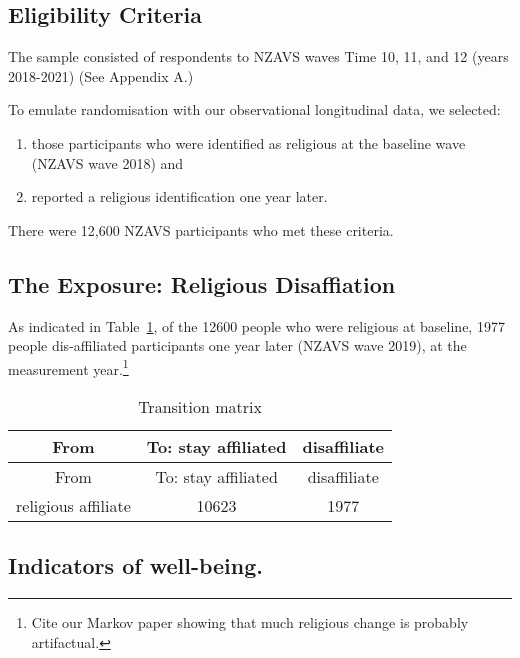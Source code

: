 \documentclass[
  singlecolumn]{report}
\providecommand{\tightlist}{%
  \setlength{\itemsep}{0pt}\setlength{\parskip}{0pt}}\usepackage{longtable,booktabs,array}
\begin{document}
\hypertarget{eligibility-criteria}{%
\subsection{Eligibility Criteria}\label{eligibility-criteria}}

The sample consisted of respondents to NZAVS waves Time 10, 11, and 12
(years 2018-2021) (See Appendix A.)

To emulate randomisation with our observational longitudinal data, we
selected:

\begin{enumerate}
\def\labelenumi{\arabic{enumi}.}
\tightlist
\item
  those participants who were identified as religious at the baseline
  wave (NZAVS wave 2018) and
\item
  reported a religious identification one year later.
\end{enumerate}

There were 12,600 NZAVS participants who met these criteria.

\hypertarget{the-exposure-religious-disaffiation}{%
\subsection{The Exposure: Religious
Disaffiation}\label{the-exposure-religious-disaffiation}}

As indicated in Table~\ref{tbl-transition}, of the 12600 people who were
religious at baseline, 1977 people dis-affiliated participants one year
later (NZAVS wave 2019), at the measurement year.\footnote{Cite our
  Markov paper showing that much religious change is probably
  artifactual.}

\hypertarget{tbl-transition}{}
\begin{longtable}[]{@{}ccc@{}}
\caption{\label{tbl-transition}Transition matrix}\tabularnewline
\toprule\noalign{}
From & To: stay affiliated & disaffiliate \\
\midrule\noalign{}
\endfirsthead
\toprule\noalign{}
From & To: stay affiliated & disaffiliate \\
\midrule\noalign{}
\endhead
\bottomrule\noalign{}
\endlastfoot
religious affiliate & 10623 & 1977 \\
\end{longtable}

\hypertarget{indicators-of-well-being.}{%
\subsection{Indicators of well-being.}\label{indicators-of-well-being.}}
\end{document}
